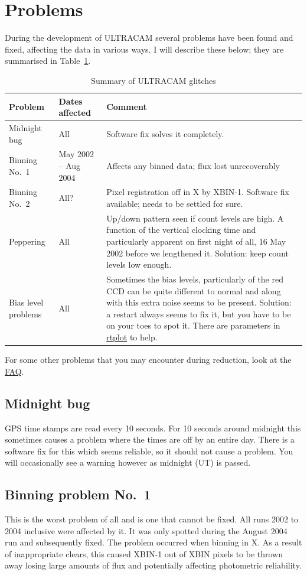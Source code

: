 \documentclass[10pt,a4paper,twocolumn]{article}
\newcommand{\main}{http://quetzel.csc.warwick.ac.uk/phsaap/software}
\newcommand{\ultracam}{\main/ultracam/html}
\begin{document}
\section{Problems}

During the development of ULTRACAM several problems have been found and fixed,
affecting the data in various ways. I will describe these below; they
are summarised in Table~\ref{tab:glitches}.
\begin{table}
\begin{tabular}{llp{3in}}
Problem & Dates affected & Comment \\
\hline
Midnight bug   & All                  & Software fix solves it completely.\\
Binning No.\ 1 & May 2002 -- Aug 2004 & Affects any binned data; flux
lost unrecoverably\\
Binning No.\ 2 & All?        & Pixel registration off in X by XBIN-1. 
Software fix available; needs to be settled for sure.\\
Peppering      & All                  & Up/down pattern seen if count
levels are high. A function of the 
vertical clocking time and particularly apparent on first night of
all, 16 May 2002 before we lengthened it. Solution: keep count levels low enough.\\
Bias level problems  & All & Sometimes the bias levels, particularly of the
red CCD can be quite different to normal and along with this extra
noise seems to be present. Solution: a restart always seems to fix it,
but you have to be on your toes to spot it. There are parameters in
\href{\ultracam/rtplot.html}{rtplot} to help.\\ 
\hline
\end{tabular}
\caption{Summary of ULTRACAM glitches\label{tab:glitches}}
\end{table}
For some other problems that you may encounter during reduction, look at the
\href{\ultracam/FAQ.html}{FAQ}. 

\subsection{Midnight bug}
GPS time stamps are read every 10 seconds. For 10 seconds around midnight this
sometimes causes a problem where the times are off by an entire day. There is a
software fix for this which seems reliable, so it should not cause a problem.
You will occasionally see a warning however as midnight (UT) is passed.

\subsection{Binning problem No.\ 1}
This is the worst problem of all and is one that cannot be fixed. All runs 2002 to 2004
inclusive were affected by it. It was only spotted during the August 2004 run
and subsequently fixed. The problem occurred when binning in X. As a result of
inappropriate clears, this caused XBIN-1 out of XBIN pixels to be thrown away
losing large amounts of flux and potentially affecting photometric reliability.
\end{document}
